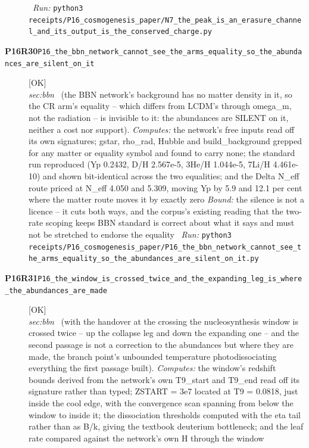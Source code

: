 \begin{description}
\ \emph{Run:} \texttt{python3 receipts/P16\_cosmogenesis\_paper/N7\_the\_peak\_is\_an\_erasure\_channel\_and\_its\_output\_is\_the\_conserved\_charge.py}
\item[\rcptlabel{P16_the_bbn_network_cannot_see_the_arms_equality_so_the_abundances_are_silent_on_it}{P16R30}\textbf{P16R30}\quad\texttt{P16\_the\_bbn\_network\_cannot\_see\_the\_arms\_equality\_so\_the\_abundances\_are\_silent\_on\_it}]\hfill\textsf{[OK]}\\
\textit{sec:bbn} \ (the BBN network's background has no matter density in it, so the CR arm's equality -- which differs from LCDM's through omega\_m, not the radiation -- is invisible to it: the abundances are SILENT on it, neither a cost nor support). 
\emph{Computes:} the network's free inputs read off its own signatures; gstar, rho\_rad, Hubble and build\_background grepped for any matter or equality symbol and found to carry none; the standard run reproduced (Yp 0.2432, D/H 2.567e-5, 3He/H 1.044e-5, 7Li/H 4.461e-10) and shown bit-identical across the two equalities; and the Delta N\_eff route priced at N\_eff 4.050 and 5.309, moving Yp by 5.9 and 12.1 per cent where the matter route moves it by exactly zero
 \emph{Bound:} the silence is not a licence -- it cuts both ways, and the corpus's existing reading that the two-rate scoping keeps BBN standard is correct about what it says and must not be stretched to endorse the equality
\ \emph{Run:} \texttt{python3 receipts/P16\_cosmogenesis\_paper/P16\_the\_bbn\_network\_cannot\_see\_the\_arms\_equality\_so\_the\_abundances\_are\_silent\_on\_it.py}
\item[\rcptlabel{P16_the_window_is_crossed_twice_and_the_expanding_leg_is_where_the_abundances_are_made}{P16R31}\textbf{P16R31}\quad\texttt{P16\_the\_window\_is\_crossed\_twice\_and\_the\_expanding\_leg\_is\_where\_the\_abundances\_are\_made}]\hfill\textsf{[OK]}\\
\textit{sec:bbn} \ (with the handover at the crossing the nucleosynthesis window is crossed twice -- up the collapse leg and down the expanding one -- and the second passage is not a correction to the abundances but where they are made, the branch point's unbounded temperature photodissociating everything the first passage built). 
\emph{Computes:} the window's redshift bounds derived from the network's own T9\_start and T9\_end read off its signature rather than typed; ZSTART = 3e7 located at T9 = 0.0818, just inside the cool edge, with the convergence scan spanning from below the window to inside it; the dissociation thresholds computed with the eta tail rather than as B/k, giving the textbook deuterium bottleneck; and the leaf rate compared against the network's own H through the window

\end{description}
